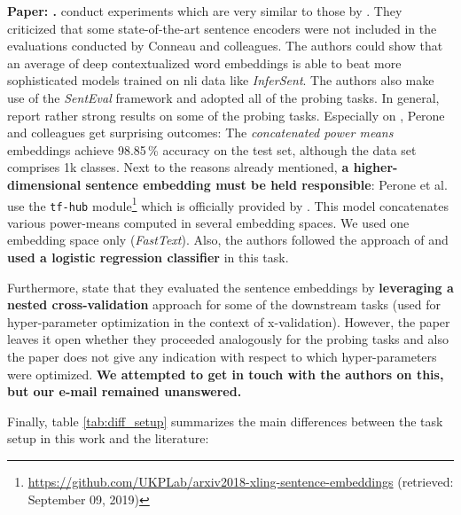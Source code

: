  \textbf{Paper: .} \citep{Perone.2018} conduct experiments which are very similar to those by \citep{Conneau.2018a}. They criticized that some state-of-the-art sentence encoders were not included in the evaluations conducted by Conneau and colleagues. The authors could show that an average of deep contextualized word embeddings is able to beat more sophisticated models trained on \gls{nli} data like \textit{InferSent}. The authors also make use of the \textit{SentEval} framework and adopted all of the probing tasks. In general, \citep{Perone.2018} report rather strong results on some of the probing tasks. Especially on , Perone and colleagues get surprising outcomes: The \textit{concatenated power means} embeddings achieve 98.85\,\% accuracy on the test set, although the data set comprises 1k classes. Next to the reasons already mentioned, \textbf{a higher-dimensional sentence embedding must be held responsible}: Perone et al. use the \texttt{tf-hub} module\footnote{\url{https://github.com/UKPLab/arxiv2018-xling-sentence-embeddings} (retrieved: September 09, 2019)} which is officially provided by \citep{Rueckle.2018}. This model concatenates various power-means computed in several embedding spaces. We used one embedding space only (\textit{FastText}). Also, the authors followed the approach of \citep{Conneau.2018a} and \textbf{used a logistic regression classifier} in this task.

Furthermore, \citep{Perone.2018} state that they evaluated the sentence embeddings by \textbf{leveraging a nested cross-validation} approach for some of the downstream tasks (used for hyper-parameter optimization in the context of x-validation). However, the paper leaves it open whether they proceeded analogously for the probing tasks and also the paper does not give any indication with respect to which hyper-parameters were optimized. \textbf{We attempted to get in touch with the authors on this, but our e-mail remained unanswered.}

Finally, table \vref{tab:diff_setup} summarizes the main differences between the task setup in this work and the literature:



